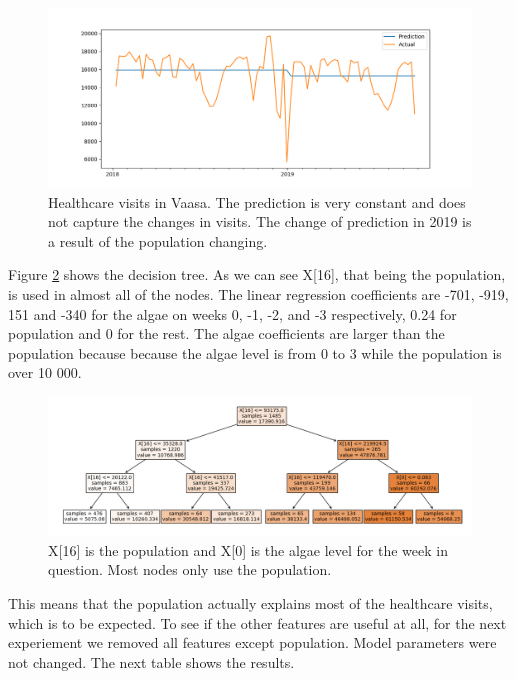 \documentclass[a4paper, 12pt, english]{article}
\begin{document}
\begin{figure}[h]
\includegraphics[width=\textwidth]{predictions1}
\caption{
Healthcare visits in Vaasa. The prediction is very
constant and does not capture the changes in
visits. The change of prediction in
2019 is a result of the population changing.
}
\label{predictions1}
\end{figure}

Figure \ref{tree1} shows the decision tree. As we can see
X[16], that being the population, is used in almost
all of the nodes. The linear regression coefficients
are -701, -919,  151 and -340 for the algae on weeks
0, -1, -2, and -3 respectively, 0.24 for population
and 0 for the rest. The algae coefficients are larger
than the population because because the algae level is from 0 to 3
while the population is over 10 000.

\begin{figure}[h]
\includegraphics[width=\textwidth]{tree1}
\caption{
X[16] is the population and X[0] is the algae level for the week in question.
Most nodes only use the population.
}
\label{tree1}
\end{figure}

This means that the population actually
explains most of the healthcare visits, which is
to be expected. To see if the other features are useful at all,
for the next experiement we removed all features
except population. Model parameters were not changed.
The next table shows the results.\\
\end{document}
